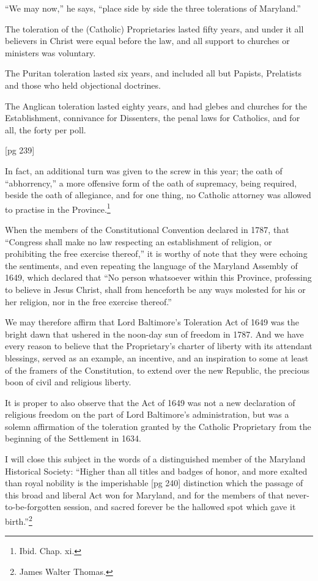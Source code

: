“We may now,” he says, “place side by side the
three tolerations of Maryland.”

The toleration of the (Catholic) Proprietaries
lasted fifty years, and under it all believers in
Christ were equal before the law, and all support
to churches or ministers was voluntary.

The Puritan toleration lasted six years, and included
all but Papists, Prelatists and those who
held objectional doctrines.

The Anglican toleration lasted eighty years, and
had glebes and churches for the Establishment,
connivance for Dissenters, the penal laws for Catholics,
and for all, the forty per poll.

[pg 239]

In fact, an additional turn was given to the
screw in this year; the oath of “abhorrency,” a
more offensive form of the oath of supremacy, being
required, beside the oath of allegiance, and for
one thing, no Catholic attorney was allowed to
practise in the Province.\footnote{Ibid. Chap. xi.}

When the members of the Constitutional Convention
declared in 1787, that “Congress shall
make no law respecting an establishment of religion,
or prohibiting the free exercise thereof,” it is
worthy of note that they were echoing the sentiments,
and even repeating the language of the
Maryland Assembly of 1649, which declared that
“No person whatsoever within this Province, professing
to believe in Jesus Christ, shall from henceforth
be any ways molested for his or her religion,
nor in the free exercise thereof.”

We may therefore affirm that Lord Baltimore's
Toleration Act of 1649 was the bright dawn that
ushered in the noon-day sun of freedom in 1787.
And we have every reason to believe that the Proprietary's
charter of liberty with its attendant
blessings, served as an example, an incentive, and
an inspiration to some at least of the framers of
the Constitution, to extend over the new Republic,
the precious boon of civil and religious liberty.

It is proper to also observe that the Act of 1649
was not a new declaration of religious freedom on
the part of Lord Baltimore's administration, but
was a solemn affirmation of the toleration granted
by the Catholic Proprietary from the beginning of
the Settlement in 1634.

I will close this subject in the words of a distinguished
member of the Maryland Historical Society:
“Higher than all titles and badges of honor, and
more exalted than royal nobility is the imperishable
[pg 240]
distinction which the passage of this broad
and liberal Act won for Maryland, and for the
members of that never-to-be-forgotten session, and
sacred forever be the hallowed spot which gave it
birth.”\footnote{James Walter Thomas.}

